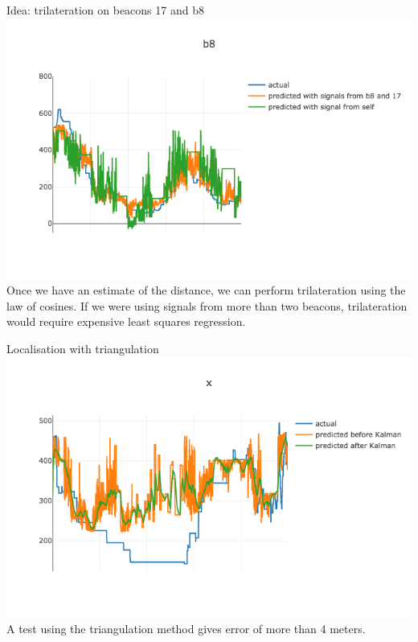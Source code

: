 \documentclass[landscape]{infslides}
\begin{document}
\begin{slide}{Idea: trilateration on beacons 17 and b8}
\includegraphics[width=\linewidth]{images/dist_f_rssi_b8.png}
Once we have an estimate of the distance, we can perform trilateration using the law of cosines. If we were using signals from more than two beacons, trilateration would require expensive least squares regression.
\end{slide}

\begin{slide}{Localisation with triangulation}
\includegraphics[width=\linewidth]{images/trilateration_x.png}
A test using the triangulation method gives error of more than 4 meters.
\end{slide}
\end{document}
